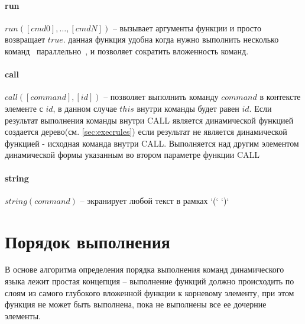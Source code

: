 \documentclass[../index.tex]{subfiles}
\begin{document}
\label{p:run}
\paragraph{run}
$run([cmd0], \dotsc, [cmdN])$ -- вызывает аргументы функции и просто возвращает $true$. данная функция 
удобна когда нужно выполнить несколько команд ~параллельно~, и позволяет сократить вложенность команд.

\label{p:call}
\paragraph{call}
$call([command], [id])$ -- позволяет выполнить команду $command$ в контексте элементе с $id$, 
в данном случае $this$ внутри команды будет равен $id$. Если результат выполнения команды внутри CALL 
является динамической функцией создается дерево(см. \autoref{sec:execrules}) 
если результат не является динамической функцией - исходная команда внутри CALL. 
Выполняется над другим элементом динамической формы указанным во втором параметре функции CALL 

\label{p:string}
\paragraph{string}
$string(command)$ -- экранирует любой текст в рамках `(` `)`

\section{Порядок выполнения}\label{sec:execrules} 

В основе алгоритма определения порядка выполнения команд динамического языка лежит простая концепция -- выполнение функций должно происходить по слоям из самого глубокого вложенной функции к корневому элементу, при этом функция не может быть выполнена, пока не выполнены все ее дочерние элементы.
\end{document}
